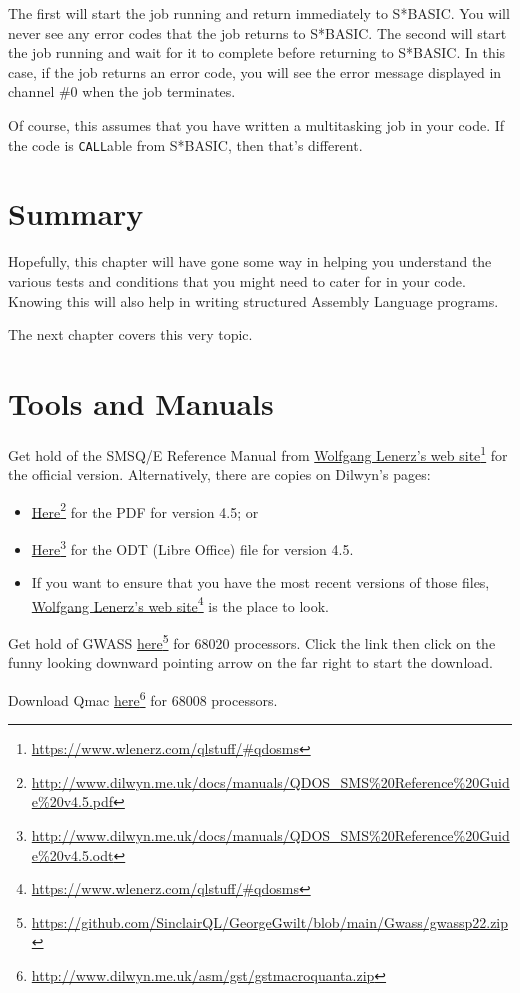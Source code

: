 The first will start the job running and return immediately to S*BASIC. You will never see any error codes that the job returns to S*BASIC. The second will start the job running and wait for it to complete before returning to S*BASIC. In this case, if the job returns an error code, you will see the error message displayed in channel \#0 when the job terminates.

Of course, this assumes that you have written a multitasking job in your code. If the code is \texttt{CALL}able from S*BASIC, then that's different.



\section{Summary}

Hopefully, this chapter will have gone some way in helping you understand the various tests and conditions that you might need to cater for in your code. Knowing this will also help in writing structured Assembly Language programs. 

The next chapter covers this very topic.

\section{Tools and Manuals\label{sec:Tools-and-Manuals}}

Get hold of the SMSQ/E Reference Manual from \href{https://www.wlenerz.com/qlstuff/\#qdosms}{Wolfgang Lenerz's web site}\footnote{\url{https://www.wlenerz.com/qlstuff/\#qdosms}}
for the official version. Alternatively, there are copies on Dilwyn's
pages:
\begin{itemize}
\item \href{http://www.dilwyn.me.uk/docs/manuals/QDOS_SMS\%20Reference\%20Guide\%20v4.5.pdf}{Here}\footnote{\url{http://www.dilwyn.me.uk/docs/manuals/QDOS\_SMS\%20Reference\%20Guide\%20v4.5.pdf}}
for the PDF for version 4.5; or

\item \href{http://www.dilwyn.me.uk/docs/manuals/QDOS_SMS\%20Reference\%20Guide\%20v4.5.odt}{Here}\footnote{\url{http://www.dilwyn.me.uk/docs/manuals/QDOS\_SMS\%20Reference\%20Guide\%20v4.5.odt}}
for the ODT (Libre Office) file for version 4.5.

\item If you want to ensure that you have the most recent versions of those
files, \href{https://www.wlenerz.com/qlstuff/\#qdosms}{Wolfgang Lenerz's web site}\footnote{\url{https://www.wlenerz.com/qlstuff/\#qdosms}}
is the place to look.
\end{itemize}


Get hold of GWASS \href{https://github.com/SinclairQL/GeorgeGwilt/blob/main/Gwass/gwassp22.zip}{here}\footnote{\url{https://github.com/SinclairQL/GeorgeGwilt/blob/main/Gwass/gwassp22.zip}}
for 68020 processors. Click the link then click on the funny looking downward pointing arrow on the far right to start the download.

Download Qmac \href{http://www.dilwyn.me.uk/asm/gst/gstmacroquanta.zip}{here}\footnote{\url{http://www.dilwyn.me.uk/asm/gst/gstmacroquanta.zip}}
for 68008 processors.
